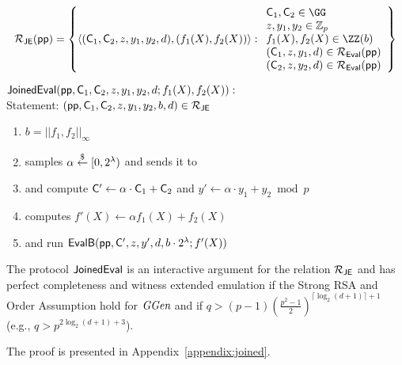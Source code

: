 \[
\mathcal{R_\textsf{JE}}(\params) = \left\lbrace
\langle (\gr{C}_1,\gr{C}_2, z, y_1,y_2,d), (f_1(X), f_2(X)) \rangle
: \\
\begin{array}{l} 
\gr{C}_1, \gr{C}_2 \in \GG \\
z, y_1, y_2 \in \mathbb{Z}_p \\
f_1(X), f_2(X) \in \ZZ(b) \\
(\gr{C}_1,z,y_1,d) \in \mathcal{R_\textsf{Eval}}(\params) \\
(\gr{C}_2,z,y_2,d) \in \mathcal{R_\textsf{Eval}}(\params)
\end{array}
\right\rbrace
\]





\begin{mdframed}
	$\pro{JoinedEval}(\crs, \gr{C}_1, \gr{C}_2, z, y_1, y_2, d; f_1(X),f_2(X)) :$  \\
Statement: $(\crs,\gr{C}_1,\gr{C}_2,z,y_1,y_2,b,d)\in \mathcal{R}_{\pro{JE}}$
			\begin{enumerate}[nolistsep]
			\item $b=||f_1,f_2||_\infty$
        \item \verifier samples $\alpha \overset{\$}{\gets} [0,2^\lambda)$ and sends it to \prover
			\item \prover and \verifier compute $\gr{C}'\gets \alpha \cdot \gr{C}_1+\gr{C}_2$ and $y'\gets \alpha \cdot y_1 +y_2 \bmod p$
			\item \prover computes $f'(X)\gets \alpha f_1(X) +f_2(X)$
			\item \prover and \verifier run $\pro{EvalB}(\params,\gr{C}',z,y',d,b\cdot 2^{\lambda};f'(X))$
		    \end{enumerate}
\end{mdframed}

\newcommand{\theoremjoined}{
The protocol $\pro{JoinedEval}$ is an interactive argument for the relation $\mathcal{R}_{\pro{JE}}$ and has perfect completeness and witness extended emulation if the Strong RSA and Order Assumption hold for $\ggen$ and if $q>(p-1)(\frac{p^2-1}{2})^{\lceil \log_2(d+1)\rceil+1}$ (e.g., $q > p^{2\log_2(d+1)+3}$). }
\begin{theorem}
\label{thm:joined}
\theoremjoined
\end{theorem}
The proof is presented in Appendix~\ref{appendix:joined}.

